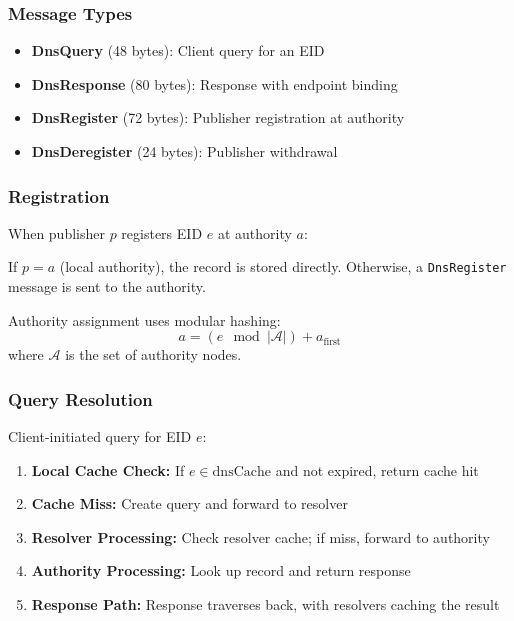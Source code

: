 \documentclass[journal,twocolumn]{IEEEtran}
\begin{document}
\subsubsection{Message Types}

\begin{itemize}
    \item \textbf{DnsQuery} (48 bytes): Client query for an EID
    \item \textbf{DnsResponse} (80 bytes): Response with endpoint binding
    \item \textbf{DnsRegister} (72 bytes): Publisher registration at authority
    \item \textbf{DnsDeregister} (24 bytes): Publisher withdrawal
\end{itemize}

\subsubsection{Registration}

When publisher $p$ registers EID $e$ at authority $a$:

If $p = a$ (local authority), the record is stored directly. 
Otherwise, a \texttt{DnsRegister} message is sent to the authority.

Authority assignment uses modular hashing:
\begin{equation}
a = (e \mod |\mathcal{A}|) + a_{\text{first}}
\end{equation}
where $\mathcal{A}$ is the set of authority nodes.

\subsubsection{Query Resolution}

Client-initiated query for EID $e$:

\begin{enumerate}
    \item \textbf{Local Cache Check:} If $e \in \text{dnsCache}$ and not expired, return cache hit
    \item \textbf{Cache Miss:} Create query and forward to resolver
    \item \textbf{Resolver Processing:} Check resolver cache; if miss, forward to authority
    \item \textbf{Authority Processing:} Look up record and return response
    \item \textbf{Response Path:} Response traverses back, with resolvers caching the result
\end{enumerate}
\end{document}
